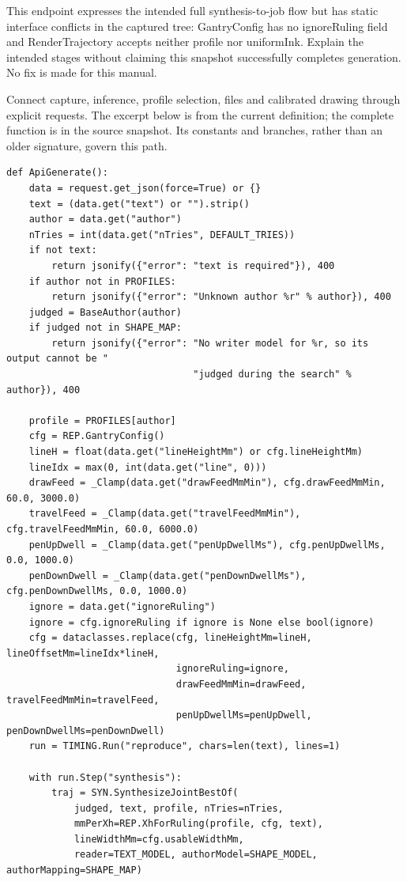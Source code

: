 This endpoint expresses the intended full synthesis-to-job flow but has static interface conflicts in the captured tree: GantryConfig has no ignoreRuling field and RenderTrajectory accepts neither profile nor uniformInk. Explain the intended stages without claiming this snapshot successfully completes generation. No fix is made for this manual.


Connect capture, inference, profile selection, files and calibrated drawing through explicit requests. The excerpt below is from the current definition; the complete function is in the source snapshot. Its constants and branches, rather than an older signature, govern this path.


\begin{lstlisting}[style=plain]
def ApiGenerate():
    data = request.get_json(force=True) or {}
    text = (data.get("text") or "").strip()
    author = data.get("author")
    nTries = int(data.get("nTries", DEFAULT_TRIES))
    if not text:
        return jsonify({"error": "text is required"}), 400
    if author not in PROFILES:
        return jsonify({"error": "Unknown author %r" % author}), 400
    judged = BaseAuthor(author)
    if judged not in SHAPE_MAP:
        return jsonify({"error": "No writer model for %r, so its output cannot be "
                                 "judged during the search" % author}), 400

    profile = PROFILES[author]
    cfg = REP.GantryConfig()
    lineH = float(data.get("lineHeightMm") or cfg.lineHeightMm)
    lineIdx = max(0, int(data.get("line", 0)))
    drawFeed = _Clamp(data.get("drawFeedMmMin"), cfg.drawFeedMmMin, 60.0, 3000.0)
    travelFeed = _Clamp(data.get("travelFeedMmMin"), cfg.travelFeedMmMin, 60.0, 6000.0)
    penUpDwell = _Clamp(data.get("penUpDwellMs"), cfg.penUpDwellMs, 0.0, 1000.0)
    penDownDwell = _Clamp(data.get("penDownDwellMs"), cfg.penDownDwellMs, 0.0, 1000.0)
    ignore = data.get("ignoreRuling")
    ignore = cfg.ignoreRuling if ignore is None else bool(ignore)
    cfg = dataclasses.replace(cfg, lineHeightMm=lineH, lineOffsetMm=lineIdx*lineH,
                              ignoreRuling=ignore,
                              drawFeedMmMin=drawFeed, travelFeedMmMin=travelFeed,
                              penUpDwellMs=penUpDwell, penDownDwellMs=penDownDwell)
    run = TIMING.Run("reproduce", chars=len(text), lines=1)

    with run.Step("synthesis"):
        traj = SYN.SynthesizeJointBestOf(
            judged, text, profile, nTries=nTries,
            mmPerXh=REP.XhForRuling(profile, cfg, text),
            lineWidthMm=cfg.usableWidthMm,
            reader=TEXT_MODEL, authorModel=SHAPE_MODEL, authorMapping=SHAPE_MAP)


\end{lstlisting}
